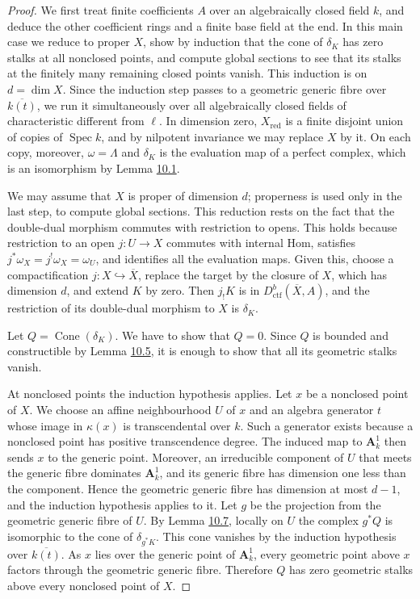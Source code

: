 \documentclass[11pt]{article}
\providecommand{\Cone}{}\renewcommand{\Cone}{\operatorname{Cone}}
\begin{document}
\begin{proof}[{Proof}]\label{bp26}%
We first treat finite coefficients \(A\) over an algebraically closed field \(k\), and deduce the other coefficient rings and a finite base field at the end. In this main case we reduce to proper \(X\), show by induction that the cone of \(\delta_K\) has zero stalks at all nonclosed points, and compute global sections to see that its stalks at the finitely many remaining closed points vanish. This induction is on \(d=\dim X\). Since the induction step passes to a geometric generic fibre over \(\overline{k(t)}\), we run it simultaneously over all algebraically closed fields of characteristic different from \(\ell\). In dimension zero, \(X_{\mathrm{red}}\) is a finite disjoint union of copies of \(\operatorname{Spec}k\), and by nilpotent invariance we may replace \(X\) by it. On each copy, moreover, \(\omega=\Lambda\) and \(\delta_K\) is the evaluation map of a perfect complex, which is an isomorphism by Lemma \hyperref[bp5]{10.1}.

We may assume that \(X\) is proper of dimension \(d\); properness is used only in the last step, to compute global sections. This reduction rests on the fact that the double-dual morphism commutes with restriction to opens. This holds because restriction to an open \(j:U\to X\) commutes with internal Hom, satisfies \(j^*\omega_X=j^!\omega_X=\omega_U\), and identifies all the evaluation maps. Given this, choose a compactification \(j:X\hookrightarrow\overline X\), replace the target by the closure of \(X\), which has dimension \(d\), and extend \(K\) by zero. Then \(j_!K\) is in \(D^b_{\mathrm{ctf}}(\overline X,A)\), and the restriction of its double-dual morphism to \(X\) is \(\delta_K\).

Let \(Q=\Cone(\delta_K)\). We have to show that \(Q=0\). Since \(Q\) is bounded and constructible by Lemma \hyperref[bp16]{10.5}, it is enough to show that all its geometric stalks vanish.

At nonclosed points the induction hypothesis applies. Let \(x\) be a nonclosed point of \(X\). We choose an affine neighbourhood \(U\) of \(x\) and an algebra generator \(t\) whose image in \(\kappa(x)\) is transcendental over \(k\). Such a generator exists because a nonclosed point has positive transcendence degree. The induced map to \(\mathbf A^1_k\) then sends \(x\) to the generic point. Moreover, an irreducible component of \(U\) that meets the generic fibre dominates \(\mathbf A^1_k\), and its generic fibre has dimension one less than the component. Hence the geometric generic fibre has dimension at most \(d-1\), and the induction hypothesis applies to it. Let \(g\) be the projection from the geometric generic fibre of \(U\). By Lemma \hyperref[bp22]{10.7}, locally on \(U\) the complex \(g^*Q\) is isomorphic to the cone of \(\delta_{g^*K}\). This cone vanishes by the induction hypothesis over \(\overline{k(t)}\). As \(x\) lies over the generic point of \(\mathbf A^1_k\), every geometric point above \(x\) factors through the geometric generic fibre. Therefore \(Q\) has zero geometric stalks above every nonclosed point of \(X\).


\end{proof}
\end{document}
